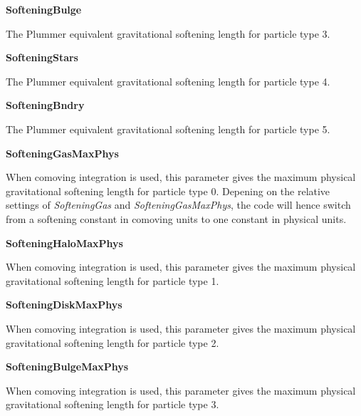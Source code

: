 \begin{DoxyItemize}
\item {\bfseries SofteningBulge} \par
 The Plummer equivalent gravitational softening length for particle type 3.
\end{DoxyItemize}


\begin{DoxyItemize}
\item {\bfseries SofteningStars} \par
 The Plummer equivalent gravitational softening length for particle type 4.
\end{DoxyItemize}


\begin{DoxyItemize}
\item {\bfseries SofteningBndry} \par
 The Plummer equivalent gravitational softening length for particle type 5.
\end{DoxyItemize}


\begin{DoxyItemize}
\item {\bfseries SofteningGasMaxPhys} \par
 When comoving integration is used, this parameter gives the maximum physical gravitational softening length for particle type 0. Depening on the relative settings of {\itshape SofteningGas\/} and {\itshape SofteningGasMaxPhys\/}, the code will hence switch from a softening constant in comoving units to one constant in physical units.
\end{DoxyItemize}


\begin{DoxyItemize}
\item {\bfseries SofteningHaloMaxPhys} \par
 When comoving integration is used, this parameter gives the maximum physical gravitational softening length for particle type 1.
\end{DoxyItemize}


\begin{DoxyItemize}
\item {\bfseries SofteningDiskMaxPhys} \par
 When comoving integration is used, this parameter gives the maximum physical gravitational softening length for particle type 2.
\end{DoxyItemize}


\begin{DoxyItemize}
\item {\bfseries SofteningBulgeMaxPhys} \par
 When comoving integration is used, this parameter gives the maximum physical gravitational softening length for particle type 3.
\end{DoxyItemize}


